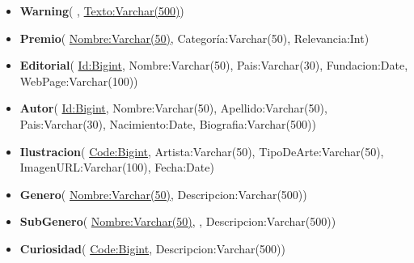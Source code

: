 \documentclass[12pt,a4paper]{article}
\begin{document}
\begin{itemize}
\item
\textbf{Warning}(
\uline{},
\uline{Texto:Varchar(500)})
 \vspace{0.2cm}

\item
\textbf{Premio}(
\uline{Nombre:Varchar(50)},
Categoría:Varchar(50),
Relevancia:Int)
 \vspace{0.2cm}

\item
\textbf{Editorial}(
\uline{Id:Bigint},
Nombre:Varchar(50),
Pais:Varchar(30),
Fundacion:Date,
WebPage:Varchar(100))
 \vspace{0.2cm}

\item
\textbf{Autor}(
\uline{Id:Bigint},
Nombre:Varchar(50),
Apellido:Varchar(50),
Pais:Varchar(30),
Nacimiento:Date,
Biografia:Varchar(500))
 \vspace{0.2cm}

\item
\textbf{Ilustracion}(
\uline{Code:Bigint},
Artista:Varchar(50),
TipoDeArte:Varchar(50),
ImagenURL:Varchar(100),
Fecha:Date)
 \vspace{0.2cm}

\item
\textbf{Genero}(
\uline{Nombre:Varchar(50)},
Descripcion:Varchar(500))
 \vspace{0.2cm}

\item
\textbf{SubGenero}(
\uline{Nombre:Varchar(50)},
,
Descripcion:Varchar(500))

\item
\textbf{Curiosidad}(
\uline{Code:Bigint},
Descripcion:Varchar(500))
\end{itemize}
 \vspace{0.5cm}
\end{document}
